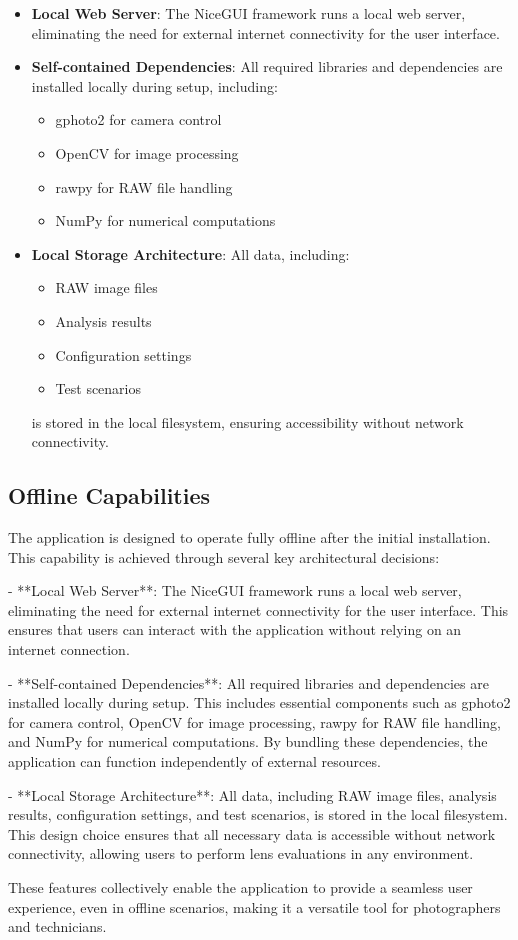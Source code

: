 \begin{itemize}
    \item \textbf{Local Web Server}: The NiceGUI framework runs a local web server, eliminating the need for external internet connectivity for the user interface.
    
    \item \textbf{Self-contained Dependencies}: All required libraries and dependencies are installed locally during setup, including:
    \begin{itemize}
        \item gphoto2 for camera control
        \item OpenCV for image processing
        \item rawpy for RAW file handling
        \item NumPy for numerical computations
    \end{itemize}
    
    \item \textbf{Local Storage Architecture}: All data, including:
    \begin{itemize}
        \item RAW image files
        \item Analysis results
        \item Configuration settings
        \item Test scenarios
    \end{itemize}
    is stored in the local filesystem, ensuring accessibility without network connectivity.
\end{itemize}


\subsection{Offline Capabilities}

The application is designed to operate fully offline after the initial installation. This capability is achieved through several key architectural decisions:

- **Local Web Server**: The NiceGUI framework runs a local web server, eliminating the need for external internet connectivity for the user interface. This ensures that users can interact with the application without relying on an internet connection.

- **Self-contained Dependencies**: All required libraries and dependencies are installed locally during setup. This includes essential components such as gphoto2 for camera control, OpenCV for image processing, rawpy for RAW file handling, and NumPy for numerical computations. By bundling these dependencies, the application can function independently of external resources.

- **Local Storage Architecture**: All data, including RAW image files, analysis results, configuration settings, and test scenarios, is stored in the local filesystem. This design choice ensures that all necessary data is accessible without network connectivity, allowing users to perform lens evaluations in any environment.

These features collectively enable the application to provide a seamless user experience, even in offline scenarios, making it a versatile tool for photographers and technicians.